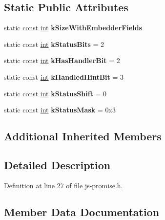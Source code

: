 \subsection*{Static Public Attributes}
\begin{DoxyCompactItemize}
\item 
static const \mbox{\hyperlink{classint}{int}} {\bfseries k\+Size\+With\+Embedder\+Fields}
\item 
\mbox{\label{classv8_1_1internal_1_1JSPromise_a70025991b9592c159fc68e97c05bd493}} 
static const \mbox{\hyperlink{classint}{int}} {\bfseries k\+Status\+Bits} = 2
\item 
\mbox{\label{classv8_1_1internal_1_1JSPromise_a85e2fd7165b96ee141a125640bc425c6}} 
static const \mbox{\hyperlink{classint}{int}} {\bfseries k\+Has\+Handler\+Bit} = 2
\item 
\mbox{\label{classv8_1_1internal_1_1JSPromise_a191992ce7b6bbde36b84a0b5434f0d98}} 
static const \mbox{\hyperlink{classint}{int}} {\bfseries k\+Handled\+Hint\+Bit} = 3
\item 
\mbox{\label{classv8_1_1internal_1_1JSPromise_a03aa05e6d33d8668bddb15fdd425dcc5}} 
static const \mbox{\hyperlink{classint}{int}} {\bfseries k\+Status\+Shift} = 0
\item 
\mbox{\label{classv8_1_1internal_1_1JSPromise_a42fca66a242ec67c5f5e637ac0a605c1}} 
static const \mbox{\hyperlink{classint}{int}} {\bfseries k\+Status\+Mask} = 0x3
\end{DoxyCompactItemize}
\subsection*{Additional Inherited Members}


\subsection{Detailed Description}


Definition at line 27 of file js-\/promise.\+h.



\subsection{Member Data Documentation}
\mbox{\label{classv8_1_1internal_1_1JSPromise_a3305b4a032ec33a44eb077d288c067c9}} 
